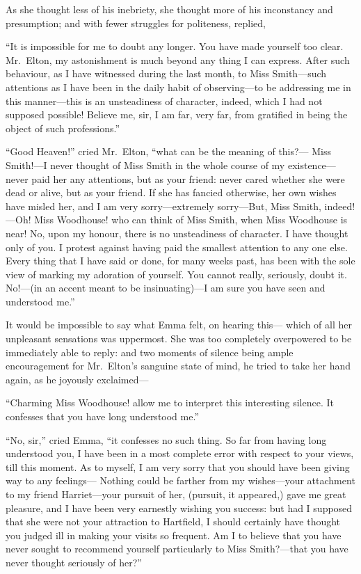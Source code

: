 As she thought less of his inebriety, she thought more of his inconstancy
and presumption; and with fewer struggles for politeness, replied,

``It is impossible for me to doubt any longer.  You have made
yourself too clear.  Mr.\ Elton, my astonishment is much beyond
any thing I can express.  After such behaviour, as I have witnessed
during the last month, to Miss Smith---such attentions as I
have been in the daily habit of observing---to be addressing me
in this manner---this is an unsteadiness of character, indeed,
which I had not supposed possible!  Believe me, sir, I am far,
very far, from gratified in being the object of such professions.''

``Good Heaven!'' cried Mr.\ Elton, ``what can be the meaning of this?---%
Miss Smith!---I never thought of Miss Smith in the whole course
of my existence---never paid her any attentions, but as your friend:
never cared whether she were dead or alive, but as your friend.
If she has fancied otherwise, her own wishes have misled her,
and I am very sorry---extremely sorry---But, Miss Smith, indeed!---Oh!
Miss Woodhouse! who can think of Miss Smith, when Miss Woodhouse
is near!  No, upon my honour, there is no unsteadiness of character.
I have thought only of you.  I protest against having paid the smallest
attention to any one else.  Every thing that I have said or done,
for many weeks past, has been with the sole view of marking my
adoration of yourself.  You cannot really, seriously, doubt it.
No!---(in an accent meant to be insinuating)---I am sure you have seen
and understood me.''

It would be impossible to say what Emma felt, on hearing this---%
which of all her unpleasant sensations was uppermost.  She was
too completely overpowered to be immediately able to reply:
and two moments of silence being ample encouragement for Mr.\ Elton's
sanguine state of mind, he tried to take her hand again, as he
joyously exclaimed---%

``Charming Miss Woodhouse! allow me to interpret this interesting silence.
It confesses that you have long understood me.''

``No, sir,'' cried Emma, ``it confesses no such thing.  So far from
having long understood you, I have been in a most complete error
with respect to your views, till this moment.  As to myself, I am
very sorry that you should have been giving way to any feelings---%
Nothing could be farther from my wishes---your attachment to my
friend Harriet---your pursuit of her, (pursuit, it appeared,) gave me
great pleasure, and I have been very earnestly wishing you success:
but had I supposed that she were not your attraction to Hartfield,
I should certainly have thought you judged ill in making your visits
so frequent.  Am I to believe that you have never sought to recommend
yourself particularly to Miss Smith?---that you have never thought
seriously of her?''

